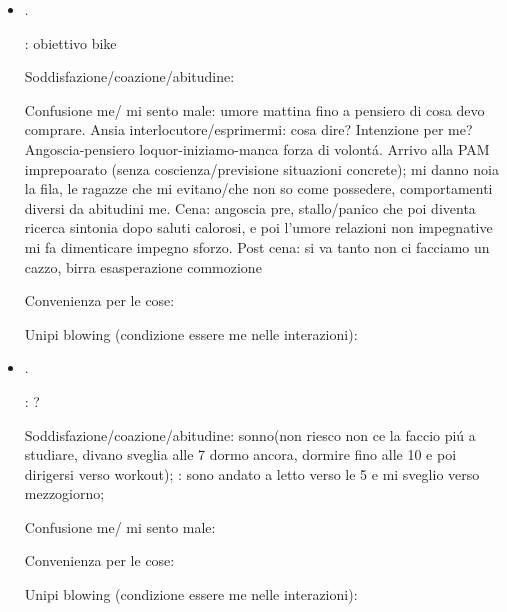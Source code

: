 \begin{itemize}
: volont\'a ASD/IF, concretezza tempo

Soddisfazione/coazione/abitudine: abdominal assoult senza essere per obiettivo/progetto poi a mezzogiorno studio per passare tempo; agire seguendo coazione, pensare/interagire essendo impulso; passeggiata dopo pranzo essere me come mancanza possibilit\'a e mi riempo d'angoscia

Confusione me/ mi sento male: sonno non penso a obiettivo

Convenienza per le cose:

Unipi blowing (condizione essere me nelle interazioni):

\item {}.

: obiettivo bike

Soddisfazione/coazione/abitudine: 

Confusione me/ mi sento male: umore mattina  fino a pensiero di cosa devo comprare.
Ansia interlocutore/esprimermi: cosa dire? Intenzione per me? Angoscia-pensiero loquor-iniziamo-manca forza di volont\'a. Arrivo alla PAM imprepoarato (senza coscienza/previsione situazioni concrete); mi danno noia la fila, le ragazze che mi evitano/che non so come possedere, comportamenti diversi da abitudini me.
Cena: angoscia pre, stallo/panico che poi diventa ricerca sintonia dopo saluti calorosi, e poi l'umore relazioni non impegnative mi fa dimenticare impegno sforzo.
Post cena: si va tanto non ci facciamo un cazzo, birra esasperazione commozione

Convenienza per le cose: 

Unipi blowing (condizione essere me nelle interazioni):

\item {}.

: ?

Soddisfazione/coazione/abitudine: sonno(non riesco non ce la faccio pi\'u a studiare, divano sveglia alle 7 dormo ancora, dormire fino alle 10 e poi dirigersi verso workout); : sono andato a letto verso le 5 e mi sveglio verso mezzogiorno; 

Confusione me/ mi sento male:

Convenienza per le cose:

Unipi blowing (condizione essere me nelle interazioni):


\end{itemize}
